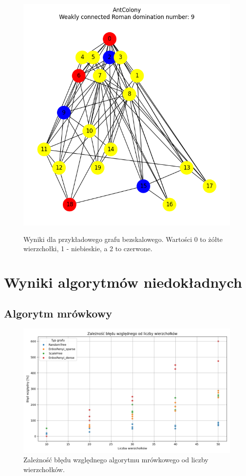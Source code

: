 \begin{figure}[H]
\begin{subcaptionbox}
            {\includegraphics[width=0.75\linewidth]{assets/plots/AntColony/ScaleFree_n20_i2_results.png}}
        \end{subcaptionbox}
    
        \caption{Wyniki dla przykładowego grafu bezskalowego. Wartości 0 to żółte wierzchołki, 1 - niebieskie, a 2 to czerwone.}
        \label{fig:tree}
    \end{figure}

\section{Wyniki algorytmów niedokładnych}

\subsection{Algorytm mrówkowy}

\begin{figure}[H]
    \centering
    \includegraphics[width=\textwidth]{assets/plots_approx/ants.png}
    \caption{Zależność błędu względnego algorytmu mrówkowego od liczby wierzchołków.}
    \label{fig:antsPlot}
\end{figure}

